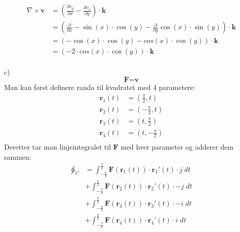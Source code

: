 \documentclass[12pt, a4paper]{article}
\begin{document}
\begin{equation}
    \begin{split}
        \nabla \times \textbf{v} &= (\frac{\partial v_y}{\partial x} - \frac{\partial v_x}{\partial y}) \cdot \textbf{k} \\
                                 &= (\frac{\partial}{\partial x} -\sin(x) \cdot \cos(y) - \frac{\partial}{\partial y} \cos(x) \cdot \sin(y)) \cdot \textbf{k} \\
                                 &= (-\cos(x) \cdot \cos(y) - cos(x) \cdot \cos(y)) \cdot \textbf{k} \\
                                 &= (-2 \cdot cos(x) \cdot \cos(y)) \cdot \textbf{k}
    \end{split}
\end{equation}
\\
c) \\
\begin{equation}
    \textbf{F} = \textbf{v}
\end{equation}
Man kan først definere randa til kvadratet med $4$ parametere:
\begin{equation}
    \begin{split}
        \textbf{r}_1(t) &= \left(\frac{\pi}{2}, t \right) \\
        \textbf{r}_2(t) &= \left(-\frac{\pi}{2}, t \right) \\
        \textbf{r}_3(t) &= \left(t, \frac{\pi}{2} \right) \\
        \textbf{r}_4(t) &= \left(t, -\frac{\pi}{2} \right) \\
    \end{split}
\end{equation}
Deretter tar man linjeintegralet til $\textbf{F}$ med hver parameter og adderer dem sammen: \\
\begin{equation}
    \begin{split}
        \ointctrclockwise_C &= \int_{-\frac{\pi}{2}}^{\frac{\pi}{2}} \textbf{F}(\textbf{r}_1(t)) \cdot \textbf{r}_1'(t) \cdot j \; dt \\
                        &+ \int_{-\frac{\pi}{2}}^{\frac{\pi}{2}} \textbf{F}(\textbf{r}_2(t)) \cdot \textbf{r}_2'(t) \cdot -j \; dt \\
                        &+ \int_{-\frac{\pi}{2}}^{\frac{\pi}{2}} \textbf{F}(\textbf{r}_3(t)) \cdot \textbf{r}_3'(t) \cdot -i \; dt \\
                        &+ \int_{-\frac{\pi}{2}}^{\frac{\pi}{2}} \textbf{F}(\textbf{r}_4(t)) \cdot \textbf{r}_4'(t) \cdot i \; dt \\
    \end{split}
\end{equation} \\
\end{document}
